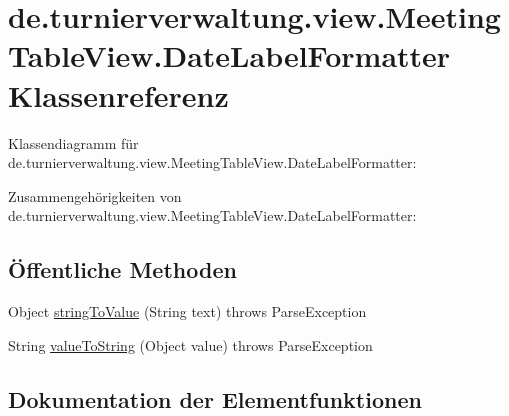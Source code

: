 \hypertarget{classde_1_1turnierverwaltung_1_1view_1_1_meeting_table_view_1_1_date_label_formatter}{}\section{de.\+turnierverwaltung.\+view.\+Meeting\+Table\+View.\+Date\+Label\+Formatter Klassenreferenz}
\label{classde_1_1turnierverwaltung_1_1view_1_1_meeting_table_view_1_1_date_label_formatter}


Klassendiagramm für de.\+turnierverwaltung.\+view.\+Meeting\+Table\+View.\+Date\+Label\+Formatter\+:


Zusammengehörigkeiten von de.\+turnierverwaltung.\+view.\+Meeting\+Table\+View.\+Date\+Label\+Formatter\+:
\subsection*{Öffentliche Methoden}
\begin{DoxyCompactItemize}
\item 
Object \hyperlink{classde_1_1turnierverwaltung_1_1view_1_1_meeting_table_view_1_1_date_label_formatter_a889f21c5c6e6937378d99c59ee553d3a}{string\+To\+Value} (String text)  throws Parse\+Exception 
\item 
String \hyperlink{classde_1_1turnierverwaltung_1_1view_1_1_meeting_table_view_1_1_date_label_formatter_ac552b2225a2bb07e6505755800c84d49}{value\+To\+String} (Object value)  throws Parse\+Exception 
\end{DoxyCompactItemize}


\subsection{Dokumentation der Elementfunktionen}
